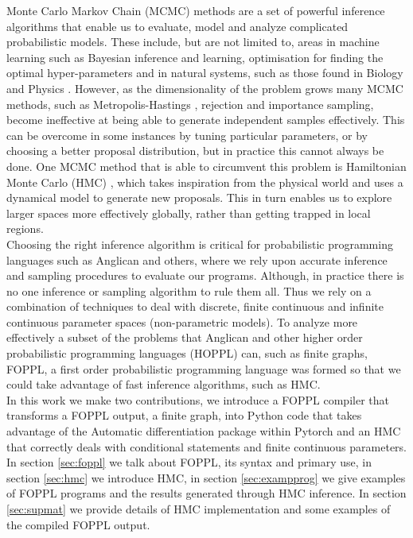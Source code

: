 \documentclass[twoside]{article}
\begin{document}
Monte Carlo Markov Chain (MCMC) methods are a set of powerful inference algorithms \citep{berg2008markov} that enable us to evaluate, model and analyze complicated probabilistic models. These include, but are not limited to, areas in machine learning such as Bayesian inference and learning, optimisation for finding the optimal hyper-parameters \citep{andrieu2003introduction} and in natural systems, such as those found in Biology \citep{sorensen2007likelihood} and Physics \citep{duane1987hybrid}. 
However, as the dimensionality of the problem grows many MCMC methods, such as Metropolis-Hastings \citep{hastings1970monte}, rejection and importance sampling,  become ineffective at being able to generate independent samples effectively. This can be overcome in some instances by tuning particular parameters, or by choosing a better proposal distribution, but in practice this cannot always be done. One MCMC method that is able to circumvent this problem is Hamiltonian Monte Carlo (HMC) \citep{neal2011mcmc}\citep{duane1987hybrid}, which takes inspiration from the physical world and uses a dynamical model to generate new proposals. This in turn enables us to explore larger spaces more effectively globally, rather than getting trapped in local regions. \\
Choosing the right inference algorithm is critical for probabilistic programming languages \citep{tolpin2015probabilistic} such as Anglican \citep{wood2014new} and others, where we rely upon accurate inference and sampling procedures to evaluate our programs. Although, in practice there is no one inference or sampling algorithm to rule them all. Thus we rely on a combination of techniques to deal with discrete, finite continuous and infinite continuous parameter spaces (non-parametric models). To analyze more effectively a subset of the problems that Anglican and other higher order probabilistic programming languages (HOPPL) can, such as finite graphs, FOPPL, a first order probabilistic programming language was formed so that we could take advantage of fast inference algorithms, such as HMC.\\
In this work we make two contributions, we introduce a FOPPL compiler that transforms a FOPPL output, a finite graph, into Python code that takes advantage of the Automatic differentiation package within Pytorch \citep{pytorch} and an HMC that correctly deals with conditional statements and finite continuous parameters.
In section \ref{sec:foppl} we talk about FOPPL, its syntax and primary use, in section \ref{sec:hmc} we introduce HMC, in section \ref{sec:exampprog} we give examples of FOPPL programs and the results generated through HMC inference. In section \ref{sec:supmat} we provide details of HMC implementation and some examples of the compiled FOPPL output. 
\end{document}
